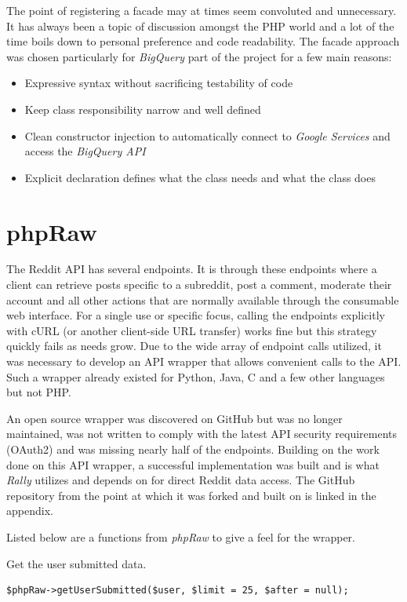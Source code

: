 \documentclass[msc,oneside]{ubcthesis}%
\begin{document}
The point of registering a facade may at times seem convoluted and unnecessary. It has always been a topic of discussion amongst the PHP world and a lot of the time boils down to personal preference and code readability. The facade approach was chosen particularly for \textit{BigQuery} part of the project for a few main reasons:
\begin{itemize}
  \item Expressive syntax without sacrificing testability of code
  \item Keep class responsibility narrow and well defined
  \item Clean constructor injection to automatically connect to \textit{Google Services} and access the \textit{BigQuery API}
  \item Explicit declaration defines what the class needs and what the class does
\end{itemize}

\section{phpRaw}
The Reddit API has several endpoints. It is through these endpoints where a client can retrieve posts specific to a subreddit, post a comment, moderate their account and all other actions that are normally available through the consumable web interface. For a single use or specific focus, calling the endpoints explicitly with cURL (or another client-side URL transfer) works fine but this strategy quickly fails as needs grow. Due to the wide array of endpoint calls utilized, it was necessary to develop an API wrapper that allows convenient calls to the API. Such a wrapper already existed for Python, Java, C and a few other languages but not PHP.
\par
An open source wrapper was discovered on GitHub but was no longer maintained, was not written to comply with the latest API security requirements (OAuth2) and was missing nearly half of the endpoints. Building on the work done on this API wrapper, a successful implementation was built and is what \textit{Rally} utilizes and depends on for direct Reddit data access. The GitHub repository from the point at which it was forked and built on is linked in the appendix.
\par 
Listed below are a functions from \textit{phpRaw} to give a feel for the wrapper.
\begin{center}
Get the user submitted data.
\end{center}
\begin{lstlisting}
$phpRaw->getUserSubmitted($user, $limit = 25, $after = null);
\end{lstlisting}
\end{document}

